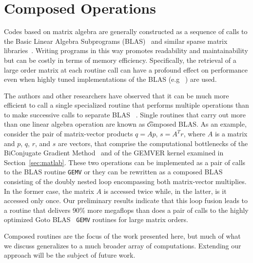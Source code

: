 \documentclass[11pt]{article}
\begin{document}
\section{Composed Operations}
\label{sec:composed}

Codes based on matrix algebra are generally constructed as a sequence of calls to the Basic Linear Algebra Subprograms (BLAS)~\cite{Dongarra:1988uq,Lawson:1979kx,Dongarra:1990fk} and similar sparse matrix libraries~\cite{Saad:fr,George:1981uq}. Writing programs in this way promotes readability and maintainability but can be costly in terms of memory efficiency. Specifically, the retrieval of a large order matrix at each routine call can have a profound effect on performance even when highly tuned implementations of the BLAS (e.g ~\cite{Bilmes:1997ye,Whaley:1998fk,IntelMath:oq,ESSL:kl,Goto:2006fk}) are used.

The authors and other researchers have observed that it can be much more efficient to call a single specialized routine that performs multiple operations than to make successive calls to separate BLAS ~\cite{Ashby:uq,Blackford:2002vn,Stanley:CSD-98-992,baker03blgmres,baker03lgmres,Dennis:2005tg,Howell:2008,gropp01,Vuduc:2003kl}.  Single routines that carry out more than one linear algebra operation are known as {\t composed} BLAS. As an example, consider the pair of matrix-vector products $q  = Ap$, $s  = A^Tr$, where $A$ is a matrix and $p$, $q$, $r$, and $s$ are vectors, that comprise the computational
bottlenecks of the BiConjugate Gradient Method~\cite{Barrett:1994kx,Saad:2003fk}  and of the GEMVER kernel examined in Section~\ref{sec:matlab}.   These two operations can be implemented as a pair of calls to the BLAS routine {\tt GEMV} or they can be rewritten as a composed BLAS consisting of the doubly nested loop encompassing both matrix-vector multiplies. In the former case, the matrix $A$ is accessed twice while, in the latter, is it accessed only once. Our preliminary results indicate that this loop fusion leads to a routine that delivers 90\% more megaflops than does a pair of calls to the highly optimized Goto BLAS~\cite{Goto:2006fk} {\tt GEMV} routines for large matrix orders.

Composed routines are the focus of the work presented here, but much of what we discuss generalizes to a much broader array of computations.   Extending our approach will be the subject of future work.

\end{document}

